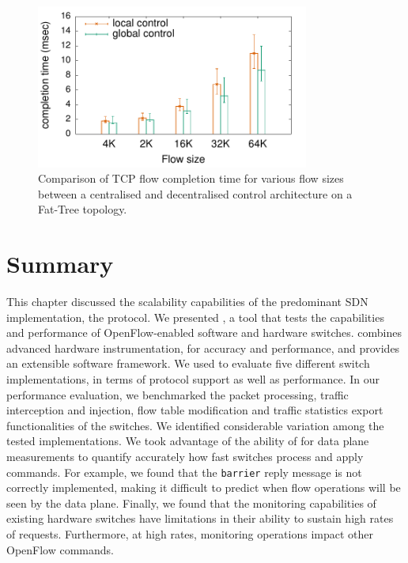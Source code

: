 \begin{figure}[h]
  \begin{center}
    \includegraphics[width=0.80\textwidth]{Chapter1/Chapter1Figs/sdnsim-use-case}
  \end{center}
  \caption[Hierarchical control evaluation using TCP flow completion
  time]{Comparison of TCP flow completion time for various flow sizes between a
  centralised and decentralised control architecture on a Fat-Tree topology.}
  \label{fig:sdnsim-use-case-result}
\end{figure}


\section{Summary} \label{sec:modeling:summary}



This chapter discussed the scalability capabilities of the predominant SDN
implementation, the \of protocol.  We presented \oflops, a tool that tests the
capabilities and performance of OpenFlow-enabled software and hardware switches.
\oflops combines advanced hardware instrumentation, for accuracy and
performance, and provides an extensible software framework. We used \oflops to
evaluate five different \of switch implementations, in terms of \of
protocol support as well as performance.  In our performance evaluation, we
benchmarked the packet processing, traffic interception and injection, flow table
modification and traffic statistics export functionalities of the switches.  We
identified considerable variation among the tested \of implementations.  We took
advantage of the ability of \oflops for data plane measurements to quantify
accurately how fast switches process and apply \of commands.  For example, we
found that the \texttt{barrier} reply message is not correctly implemented,
making it difficult to predict when flow operations will be seen by the data
plane.  Finally, we found that the monitoring capabilities of existing hardware
switches have limitations in their ability to sustain high rates of requests.
Furthermore, at high rates, monitoring operations impact other OpenFlow commands.

